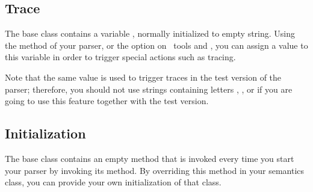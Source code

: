 \subsection{Trace}

The base class  contains a  variable
, normally initialized to empty string.
Using the method  of your parser, 
or the option  on \Mouse\ tools  and ,
you can assign a value to this variable in order to trigger special actions
such as tracing.

Note that the same value is used to trigger traces in the test version
of the parser; therefore, you should not use strings containing 
letters , , or  if you are going to use this feature
together with the test version.

\subsection{Initialization}

The base class  contains an empty method
 that is invoked every time you start your parser
by invoking its  method.
By overriding this method in your semantics class,
you can provide your own initialization of that class.

